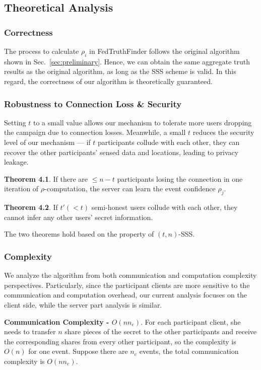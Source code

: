 \documentclass[11pt]{article}
\begin{document}
\subsection{Theoretical Analysis}
\label{sub:theoretical_analysis_1}


\subsubsection{Correctness} The process to calculate $\rho_i$ in FedTruthFinder follows the original algorithm shown in Sec.~\ref{sec:preliminary}. Hence, we can obtain the same aggregate truth results as the original algorithm, as long as the SSS scheme is valid. In this regard, the correctness of our algorithm is theoretically guaranteed.


\subsubsection{Robustness to Connection Loss \& Security}
Setting $t$ to a small value allows our mechanism to tolerate more users dropping the campaign due to connection losses. Meanwhile, a small $t$ reduces the security level of our mechanism --- if $t$ participants collude with each other, they can recover the other participants' sensed data and locations, leading to privacy leakage.

\textbf{Theorem 4.1}. If there are $\le n-t$ participants losing the connection in one iteration of $\rho$-computation, the server can learn the event confidence $\rho_j$.

\textbf{Theorem 4.2}. If $t' (<t)$ semi-honest users collude with each other, they cannot infer any other users' secret information.

The two theorems hold based on the property of $(t, n)$-SSS.

\subsubsection{Complexity}
We analyze the algorithm from both communication and computation complexity perspectives. Particularly, since the participant clients are more sensitive to the communication and computation overhead, our current analysis focuses on the client side, while the server part analysis is similar.

\textbf{Communication Complexity - $O(nn_e)$}. For each participant client, she needs to transfer $n$ share pieces of the secret to the other participants and receive the corresponding shares from every other participant, so the complexity is $O(n)$ for one event. Suppose there are $n_e$ events, the total communication complexity is $O(nn_e)$.
\end{document}
